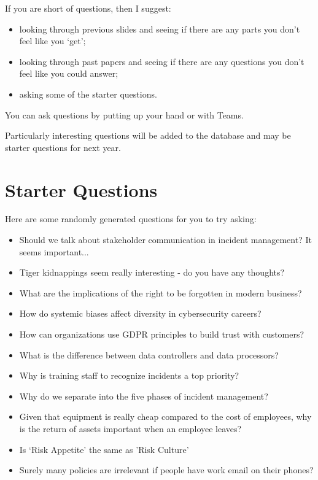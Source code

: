 \documentclass[12pt]{article}
\begin{document}
If you are short of questions, then I suggest: 

\begin{itemize} 
\item looking through previous slides and seeing if there are any parts you don't feel like you `get';
\item looking through past papers and seeing if there are any questions you don't feel like you could answer;
\item asking some of the starter questions.
\end{itemize} 

You can ask questions by putting up your hand or with Teams.  

Particularly interesting questions will be added to the database and may be starter questions for next year.  

\section*{Starter Questions} 
Here are some randomly generated questions for you to try asking: 

\begin{itemize}
  \item Should we talk about stakeholder communication in incident management? It seems important...
  \item Tiger kidnappings seem really interesting - do you have any thoughts?
  \item What are the implications of the right to be forgotten in modern business?
  \item How do systemic biases affect diversity in cybersecurity careers?
  \item How can organizations use GDPR principles to build trust with customers?
  \item What is the difference between data controllers and data processors?
  \item Why is training staff to recognize incidents a top priority?
  \item Why do we separate into the five phases of incident management?
  \item Given that equipment is really cheap compared to the cost of employees, why is the return of assets important when an employee leaves?
  \item Is `Risk Appetite' the same as 'Risk Culture'
  \item Surely many policies are irrelevant if people have work email on their phones?
\end{itemize}
\end{document}
